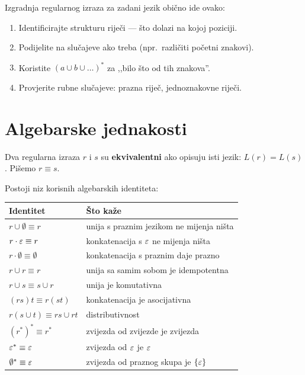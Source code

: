 \begin{kljucno}
Izgradnja regularnog izraza za zadani jezik obično ide ovako:
\begin{enumerate}
  \item Identificirajte strukturu riječi --- što dolazi na kojoj poziciji.
  \item Podijelite na slučajeve ako treba (npr.\ različiti početni znakovi).
  \item Koristite $(a \cup b \cup \ldots)^*$ za ,,bilo što od tih znakova''.
  \item Provjerite rubne slučajeve: prazna riječ, jednoznakovne riječi.
\end{enumerate}
\end{kljucno}

\section{Algebarske jednakosti}

Dva regularna izraza $r$ i $s$ su \textbf{ekvivalentni} ako opisuju isti
jezik: $L(r) = L(s)$. Pišemo $r \equiv s$.

Postoji niz korisnih algebarskih identiteta:

\begin{center}
\renewcommand{\arraystretch}{1.6}
\begin{tabular}{ll}
\hline
\textbf{Identitet} & \textbf{Što kaže} \\
\hline
$r \cup \emptyset \equiv r$ & unija s praznim jezikom ne mijenja ništa \\
$r \cdot \varepsilon \equiv r$     & konkatenacija s $\varepsilon$ ne mijenja ništa \\
$r \cdot \emptyset \equiv \emptyset$ & konkatenacija s praznim daje prazno \\
$r \cup r \equiv r$         & unija sa samim sobom je idempotentna \\
$r \cup s \equiv s \cup r$  & unija je komutativna \\
$(rs)t \equiv r(st)$        & konkatenacija je asocijativna \\
$r(s \cup t) \equiv rs \cup rt$ & distributivnost \\
$(r^*)^* \equiv r^*$        & zvijezda od zvijezde je zvijezda \\
$\varepsilon^* \equiv \varepsilon$        & zvijezda od $\varepsilon$ je $\varepsilon$ \\
$\emptyset^* \equiv \varepsilon$   & zvijezda od praznog skupa je $\{\varepsilon\}$ \\
\hline
\end{tabular}
\end{center}

